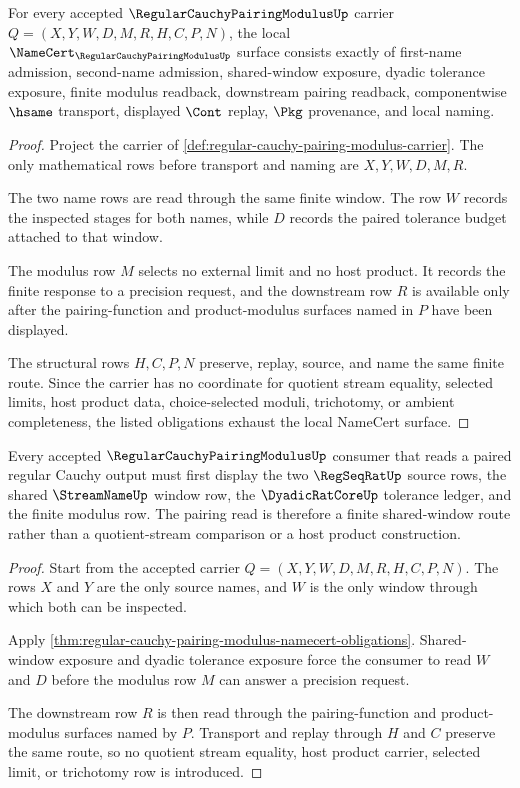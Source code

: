 \begin{theorem}
\label{thm:regular-cauchy-pairing-modulus-namecert-obligations}
For every accepted $\RegularCauchyPairingModulusUp$ carrier $Q=(X,Y,W,D,M,R,H,C,P,N)$, the local $\NameCert_{\RegularCauchyPairingModulusUp}$ surface consists exactly of first-name admission, second-name admission, shared-window exposure, dyadic tolerance exposure, finite modulus readback, downstream pairing readback, componentwise $\hsame$ transport, displayed $\Cont$ replay, $\Pkg$ provenance, and local naming.
\end{theorem}
\begin{proof}
Project the carrier of \autoref{def:regular-cauchy-pairing-modulus-carrier}. The only mathematical rows before transport and naming are $X,Y,W,D,M,R$.

The two name rows are read through the same finite window. The row $W$ records the inspected stages for both names, while $D$ records the paired tolerance budget attached to that window.

The modulus row $M$ selects no external limit and no host product. It records the finite response to a precision request, and the downstream row $R$ is available only after the pairing-function and product-modulus surfaces named in $P$ have been displayed.

The structural rows $H,C,P,N$ preserve, replay, source, and name the same finite route. Since the carrier has no coordinate for quotient stream equality, selected limits, host product data, choice-selected moduli, trichotomy, or ambient completeness, the listed obligations exhaust the local NameCert surface.
\end{proof}

\begin{theorem}
\label{thm:regular-cauchy-pairing-modulus-window-pairing}
Every accepted $\RegularCauchyPairingModulusUp$ consumer that reads a paired regular Cauchy output must first display the two $\RegSeqRatUp$ source rows, the shared $\StreamNameUp$ window row, the $\DyadicRatCoreUp$ tolerance ledger, and the finite modulus row. The pairing read is therefore a finite shared-window route rather than a quotient-stream comparison or a host product construction.
\end{theorem}
\begin{proof}
Start from the accepted carrier $Q=(X,Y,W,D,M,R,H,C,P,N)$. The rows $X$ and $Y$ are the only source names, and $W$ is the only window through which both can be inspected.

Apply \autoref{thm:regular-cauchy-pairing-modulus-namecert-obligations}. Shared-window exposure and dyadic tolerance exposure force the consumer to read $W$ and $D$ before the modulus row $M$ can answer a precision request.

The downstream row $R$ is then read through the pairing-function and product-modulus surfaces named by $P$. Transport and replay through $H$ and $C$ preserve the same route, so no quotient stream equality, host product carrier, selected limit, or trichotomy row is introduced.
\end{proof}

